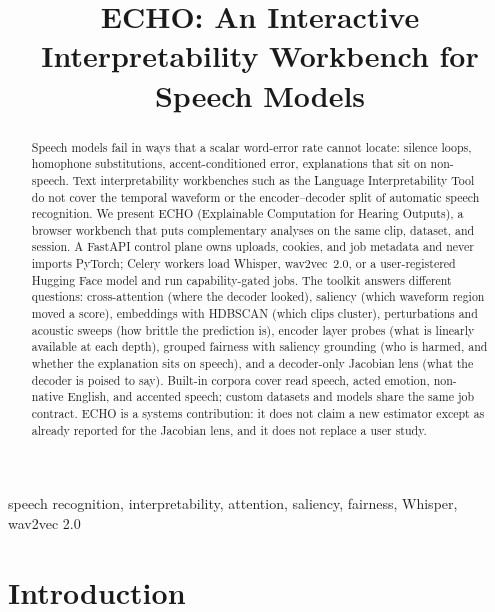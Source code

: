 \documentclass[conference]{IEEEtran}
\begin{document}
\title{ECHO: An Interactive Interpretability Workbench for Speech Models}

\author{
}

\maketitle

\begin{abstract}
Speech models fail in ways that a scalar word-error rate cannot locate: silence loops, homophone substitutions, accent-conditioned error, explanations that sit on non-speech. Text interpretability workbenches such as the Language Interpretability Tool do not cover the temporal waveform or the encoder--decoder split of automatic speech recognition. We present ECHO (Explainable Computation for Hearing Outputs), a browser workbench that puts complementary analyses on the same clip, dataset, and session. A FastAPI control plane owns uploads, cookies, and job metadata and never imports PyTorch; Celery workers load Whisper, wav2vec~2.0, or a user-registered Hugging Face model and run capability-gated jobs. The toolkit answers different questions: cross-attention (where the decoder looked), saliency (which waveform region moved a score), embeddings with HDBSCAN (which clips cluster), perturbations and acoustic sweeps (how brittle the prediction is), encoder layer probes (what is linearly available at each depth), grouped fairness with saliency grounding (who is harmed, and whether the explanation sits on speech), and a decoder-only Jacobian lens (what the decoder is poised to say). Built-in corpora cover read speech, acted emotion, non-native English, and accented speech; custom datasets and models share the same job contract. ECHO is a systems contribution: it does not claim a new estimator except as already reported for the Jacobian lens, and it does not replace a user study.
\end{abstract}

\begin{IEEEkeywords}
speech recognition, interpretability, attention, saliency, fairness, Whisper, wav2vec 2.0
\end{IEEEkeywords}

\section{Introduction}
\end{document}
